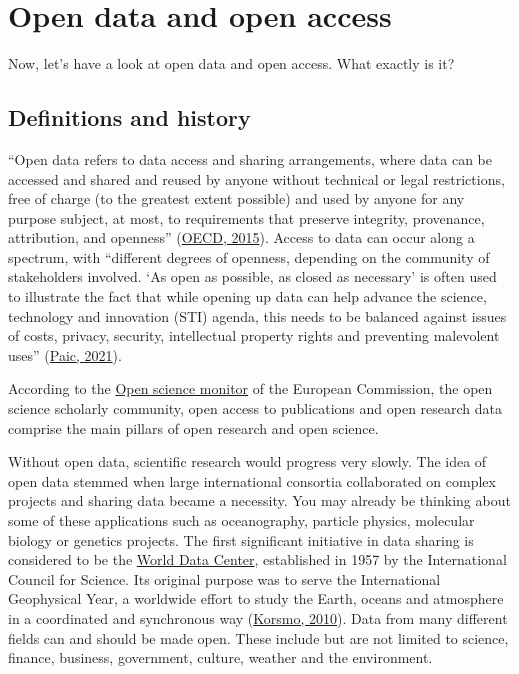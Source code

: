 \documentclass[
]{book}
\begin{document}
\hypertarget{open-data-and-open-access}{%
\chapter{Open data and open access}\label{open-data-and-open-access}}

Now, let's have a look at open data and open access. What exactly is it?

\hypertarget{definitions-and-history}{%
\section{Definitions and history}\label{definitions-and-history}}

``Open data refers to data access and sharing arrangements, where data can be accessed and shared and reused by anyone without technical or legal restrictions, free of charge (to the greatest extent possible) and used by anyone for any purpose subject, at most, to requirements that preserve integrity, provenance, attribution, and openness'' (\href{https://www.oecd-ilibrary.org/science-and-technology/making-open-science-a-reality_5jrs2f963zs1-en}{OECD, 2015}). Access to data can occur along a spectrum, with ``different degrees of openness, depending on the community of stakeholders involved. `As open as possible, as closed as necessary' is often used to illustrate the fact that while opening up data can help advance the science, technology and innovation (STI) agenda, this needs to be balanced against issues of costs, privacy, security, intellectual property rights and preventing malevolent uses'' (\href{https://goingdigital.oecd.org/data/notes/No13_ToolkitNote_OpenScience.pdf}{Paic, 2021}).

According to the \href{https://ec.europa.eu/info/research-and-innovation/strategy/strategy-2020-2024/our-digital-future/open-science/open-science-monitor_en}{Open science monitor} of the European Commission, the open science scholarly community, open access to publications and open research data comprise the main pillars of open research and open science.

Without open data, scientific research would progress very slowly. The idea of open data stemmed when large international consortia collaborated on complex projects and sharing data became a necessity. You may already be thinking about some of these applications such as oceanography, particle physics, molecular biology or genetics projects. The first significant initiative in data sharing is considered to be the \href{http://wdc.org.ua/}{World Data Center}, established in 1957 by the International Council for Science. Its original purpose was to serve the International Geophysical Year, a worldwide effort to study the Earth, oceans and atmosphere in a coordinated and synchronous way (\href{https://www.researchgate.net/publication/270166513_The_Origins_and_Principles_of_the_World_Data_Center_System}{Korsmo, 2010}). Data from many different fields can and should be made open. These include but are not limited to science, finance, business, government, culture, weather and the environment.
\end{document}
